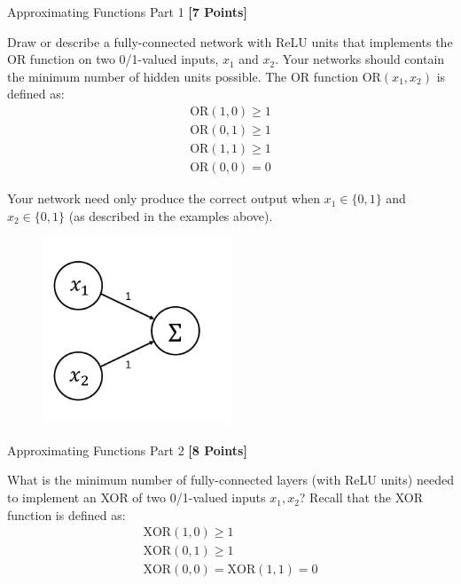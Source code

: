 \problem Approximating Functions Part 1 \textbf{[7 Points]}

Draw or describe a fully-connected network with ReLU units that implements the OR function on two 0/1-valued inputs,  $x_1$ and $x_2$.  Your networks should contain the minimum number of hidden units possible.  The OR function $\text{OR}(x_1, x_2)$ is defined as:
\begin{gather*}
\text{OR}(1, 0) \geq 1 \\
\text{OR}(0, 1) \geq 1 \\
\text{OR}(1, 1) \geq 1 \\
\text{OR}(0, 0) = 0
\end{gather*}

Your network need only produce the correct output when $x_1 \in \{0, 1\}$ and $x_2 \in \{0, 1\}$ (as described in the examples above).

\begin{subsolution}
  \begin{figure}[H]
    \begin{center}
    \includegraphics[width=0.5\textwidth]{P1C.pdf}
    \end{center}
    \end{figure}
\end{subsolution}

\problem Approximating Functions Part 2 \textbf{[8 Points]}

What is the minimum number of fully-connected layers (with ReLU units) needed to implement an XOR of two 0/1-valued inputs $x_1, x_2$? Recall that the XOR function is defined as:
\begin{gather*}
\text{XOR}(1, 0) \geq 1 \\
\text{XOR}(0, 1) \geq 1 \\
\text{XOR}(0, 0) = \text{XOR}(1, 1) = 0
\end{gather*}

